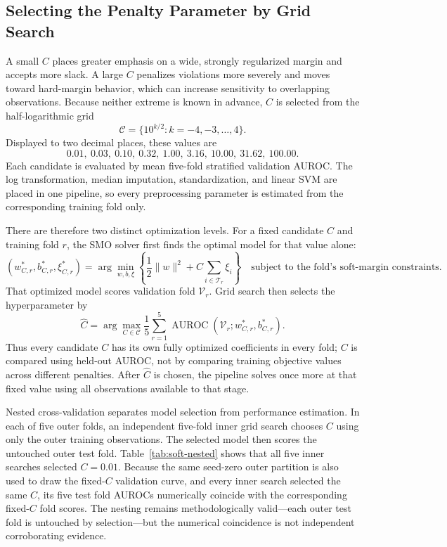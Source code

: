\documentclass[11pt,a4paper]{article}
\numberwithin{equation}{section} %
\begin{document}
\subsection{Selecting the Penalty Parameter by Grid Search}

A small $C$ places greater emphasis on a wide, strongly regularized margin and
accepts more slack. A large $C$ penalizes violations more severely and moves
toward hard-margin behavior, which can increase sensitivity to overlapping
observations. Because neither extreme is known in advance, $C$ is selected
from the half-logarithmic grid
\begin{equation}
\mathcal{C}=\{10^{k/2}:k=-4,-3,\ldots,4\}.
\end{equation}
Displayed to two decimal places, these values are
\begin{equation}
0.01,\ 0.03,\ 0.10,\ 0.32,\ 1.00,\ 3.16,\ 10.00,\ 31.62,\ 100.00.
\end{equation}
Each candidate is evaluated by mean five-fold stratified validation AUROC.
The log transformation, median imputation, standardization, and linear SVM
are placed in one pipeline, so every preprocessing parameter is estimated
from the corresponding training fold only.

There are therefore two distinct optimization levels. For a fixed candidate
$C$ and training fold $r$, the SMO solver first finds the optimal model for
that value alone:
\begin{equation}
 (w^*_{C,r},b^*_{C,r},\xi^*_{C,r})
 =\arg\min_{w,b,\xi}
 \left\{\frac12\lVert w\rVert^2+C\sum_{i\in\mathcal T_r}\xi_i\right\}
 \quad\text{subject to the fold's soft-margin constraints.}
\end{equation}
That optimized model scores validation fold $\mathcal V_r$. Grid search then
selects the hyperparameter by
\begin{equation}
 \widehat C
 =\arg\max_{C\in\mathcal C}\frac15\sum_{r=1}^{5}
 \operatorname{AUROC}\!\left(\mathcal V_r;w^*_{C,r},b^*_{C,r}\right).
\end{equation}
Thus every candidate $C$ has its own fully optimized coefficients in every
fold; $C$ is compared using held-out AUROC, not by comparing training
objective values across different penalties. After $\widehat C$ is chosen,
the pipeline solves once more at that fixed value using all observations
available to that stage.

Nested cross-validation separates model selection from performance
estimation. In each of five outer folds, an independent five-fold inner grid
search chooses $C$ using only the outer training observations. The selected
model then scores the untouched outer test fold. Table~\ref{tab:soft-nested}
shows that all five inner searches selected $C=0.01$.
Because the same seed-zero outer partition is also used to draw the fixed-$C$
validation curve, and every inner search selected the same $C$, its five test
fold AUROCs numerically coincide with the corresponding fixed-$C$ fold scores.
The nesting remains methodologically valid---each outer test fold is untouched
by selection---but the numerical coincidence is not independent corroborating
evidence.
\end{document}
